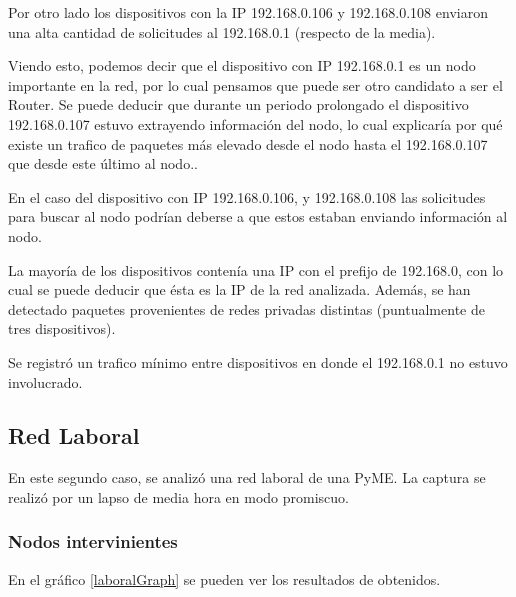 Por otro lado los dispositivos con la IP 192.168.0.106 y 192.168.0.108 enviaron una alta cantidad de solicitudes al  192.168.0.1 (respecto de la media).

Viendo esto, podemos decir que el dispositivo con IP 192.168.0.1 es un nodo importante en la red, por lo cual pensamos que puede ser otro candidato a ser el Router. Se puede deducir que durante un periodo prolongado el dispositivo 192.168.0.107 estuvo extrayendo informaci\'on del nodo, lo cual explicar\'ia por qu\'e existe un trafico de paquetes m\'as elevado desde el nodo hasta el  192.168.0.107 que desde este \'ultimo al nodo..

En el caso del dispositivo con IP 192.168.0.106, y 192.168.0.108 las solicitudes para buscar al nodo podr\'ian deberse a que estos estaban enviando informaci\'on al nodo.

La mayor\'ia de los dispositivos conten\'ia una IP con el prefijo de 192.168.0, con lo cual se puede deducir que \'esta es la IP de la red analizada. Adem\'as, se han detectado paquetes provenientes de redes privadas distintas (puntualmente de tres dispositivos).

Se registr\'o un trafico m\'inimo entre dispositivos en donde el 192.168.0.1 no estuvo involucrado.


\newpage
\subsection{Red Laboral}

En este segundo caso, se analiz\'o una red laboral de una PyME. La captura se realiz\'o por un lapso de media hora en modo promiscuo.

\subsubsection{Nodos intervinientes}
En el gr\'afico \ref{laboralGraph} se pueden ver los resultados de obtenidos.

